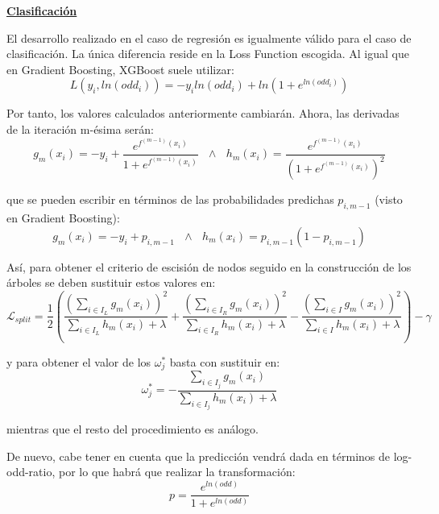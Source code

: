 \documentclass[12pt,twoside]{article}
\begin{document}
\bigskip

\textbf{\underline{Clasificación}}

El desarrollo realizado en el caso de regresión es igualmente válido para el caso de clasificación. La única diferencia reside en la Loss Function escogida. Al igual que en Gradient Boosting, XGBoost suele utilizar:
\begin{equation*}
L(y_i, ln(odd_i)) = -y_i ln(odd_i) + ln \left( 1 + e^{ln(odd_i)} \right)
\end{equation*}

Por tanto, los valores calculados anteriormente cambiarán. Ahora, las derivadas de la iteración m-ésima serán:
\begin{equation*}
g_m(x_i) = -y_i + \frac{e^{f^{(m-1)}(x_i)}}{1 + e^{f^{(m-1)}(x_i)}} \, \, \, \, \wedge \, \, \, \, h_m(x_i) = \frac{e^{f^{(m-1)}(x_i)}}{(1 + e^{f^{(m-1)}(x_i)})^2}
\end{equation*}

\noindent
que se pueden escribir en términos de las probabilidades predichas $p_{i, m-1}$ (visto en Gradient Boosting):
\begin{equation*}
g_m(x_i) = -y_i + p_{i, m-1} \, \, \, \, \wedge \, \, \, \, h_m(x_i) = p_{i, m-1}(1 - p_{i, m-1})
\end{equation*}

Así, para obtener el criterio de escisión de nodos seguido en la construcción de los árboles se deben sustituir estos valores en:
\begin{equation*}
\mathcal{L}_{split} = \frac{1}{2} \left( \frac{\left( \sum_{i \in I_L} g_m(x_i) \right)^2}{\sum_{i \in I_L} h_m(x_i) + \lambda} + \frac{\left( \sum_{i \in I_R} g_m(x_i) \right)^2}{\sum_{i \in I_R} h_m(x_i) + \lambda} - \frac{\left( \sum_{i \in I} g_m(x_i) \right)^2}{\sum_{i \in I} h_m(x_i) + \lambda} \right)   - \gamma 
\end{equation*}

\noindent
y para obtener el valor de los $\omega_j^*$ basta con sustituir en:
\begin{equation*}
\omega_j^* = - \frac{\sum_{i \in I_j} g_m(x_i)}{\sum_{i \in I_j} h_m(x_i) + \lambda}
\end{equation*}

\noindent
mientras que el resto del procedimiento es análogo.

De nuevo, cabe tener en cuenta que la predicción vendrá dada en términos de log-odd-ratio, por lo que habrá que realizar la transformación:
\begin{equation*}
p = \frac{e^{ln(odd)}}{1 + e^{ln(odd)}}
\end{equation*}
\end{document}
